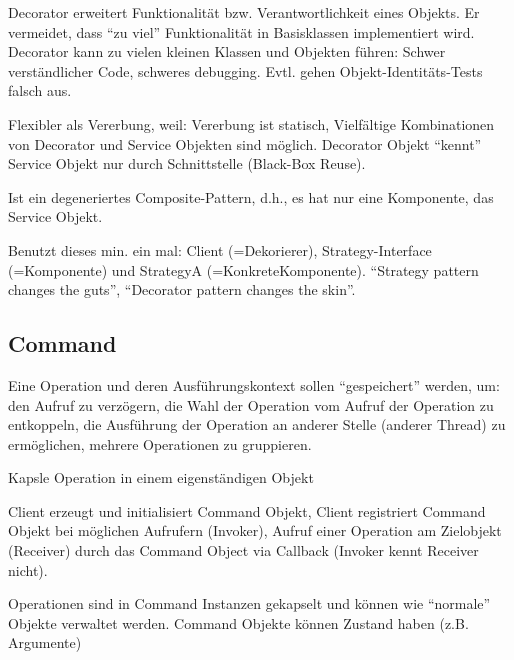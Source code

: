 \documentclass[a4paper,fontsize=9pt, DIV=calc]{scrartcl}
\begin{document}
\begin{multicols}{2}
\vspace{-0.55cm}
\begin{description}[leftmargin=*]\itemsep-2mm
\item[Konsequenzen] Decorator erweitert Funktionalität bzw. Verantwortlichkeit eines Objekts. Er vermeidet, dass "`zu viel"' Funktionalität in Basisklassen implementiert wird. Decorator kann zu vielen kleinen Klassen und Objekten führen: Schwer verständlicher Code, schweres debugging. Evtl. gehen Objekt-Identitäts-Tests falsch aus.
\item[Decorator vs Vererbung]  Flexibler als Vererbung, weil: Vererbung ist statisch, Vielfältige Kombinationen von Decorator und Service Objekten sind möglich. Decorator Objekt “kennt” Service Objekt nur durch Schnittstelle (Black-Box Reuse).
\item[Ähnlichkeit] Ist ein degeneriertes Composite-Pattern, d.h., es hat nur eine Komponente, das Service Objekt.
\item[Versus Strategy] Benutzt dieses min. ein mal: Client (=Dekorierer), Strategy-Interface (=Komponente) und StrategyA (=KonkreteKomponente). "`Strategy pattern changes the guts"', "`Decorator pattern changes the skin"'.
\end{description}


\subsection{Command}
\begin{description}[leftmargin=*]\itemsep-2mm
\item[Motivation / Problem] Eine Operation und deren Ausführungskontext sollen "`gespeichert"' werden, um: den Aufruf zu verzögern, die Wahl der Operation vom Aufruf der Operation zu entkoppeln, die Ausführung der Operation an anderer Stelle (anderer Thread) zu ermöglichen, mehrere Operationen zu gruppieren.
\item[Lösung] Kapsle Operation in einem eigenständigen Objekt
\item[Verhalten] Client erzeugt und initialisiert Command Objekt, Client registriert Command Objekt bei möglichen Aufrufern (Invoker), Aufruf einer Operation am Zielobjekt (Receiver) durch das Command Object via Callback (Invoker kennt Receiver nicht).
\item[Konsequenzen] Operationen sind in Command Instanzen gekapselt und können wie "`normale"' Objekte verwaltet werden. Command Objekte können Zustand haben (z.B. Argumente)
\end{description}


\end{multicols}
\end{document}
